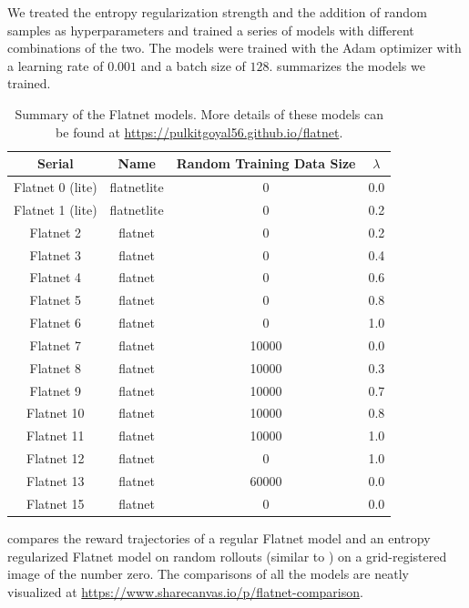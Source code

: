 We treated the entropy regularization strength and the addition of random samples as hyperparameters and trained a series of models with different combinations of the two.
The models were trained with the Adam optimizer \citep{adam} with a learning rate of \(0.001\) and a batch size of \(128\).
 summarizes the models we trained.

\begin{table}[H]
    \centering
    \begin{tabularx}{0.7\textwidth}{c c c c}
    \hline
        Serial & Name & Random Training Data Size & \(\lambda\) \\ \hline
        Flatnet 0 (lite) & flatnetlite & 0 & 0.0 \\ \hline
        Flatnet 1 (lite) & flatnetlite & 0 & 0.2 \\ \hline
        Flatnet 2 & flatnet & 0 & 0.2 \\ \hline
        Flatnet 3 & flatnet & 0 & 0.4 \\ \hline
        Flatnet 4 & flatnet & 0 & 0.6 \\ \hline
        Flatnet 5 & flatnet & 0 & 0.8 \\ \hline
        Flatnet 6 & flatnet & 0 & 1.0 \\ \hline
        Flatnet 7 & flatnet & 10000 & 0.0 \\ \hline
        Flatnet 8 & flatnet & 10000 & 0.3 \\ \hline
        Flatnet 9 & flatnet & 10000 & 0.7 \\ \hline
        Flatnet 10 & flatnet & 10000 & 0.8 \\ \hline
        Flatnet 11 & flatnet & 10000 & 1.0 \\ \hline
        Flatnet 12 & flatnet & 0 & 1.0 \\ \hline
        Flatnet 13 & flatnet & 60000 & 0.0 \\ \hline
        Flatnet 15 & flatnet & 0 & 0.0 \\ \hline
    \end{tabularx}
    \caption[Summary of the Flatnet models.]{Summary of the Flatnet models. More details of these models can be found at \url{https://pulkitgoyal56.github.io/flatnet}.}
    \label{tab:flatnet-models}
\end{table}

 compares the reward trajectories of a regular Flatnet model and an entropy regularized Flatnet model on random rollouts (similar to ) on a grid-registered image of the number zero.
The comparisons of all the models are neatly visualized at \url{https://www.sharecanvas.io/p/flatnet-comparison}.

